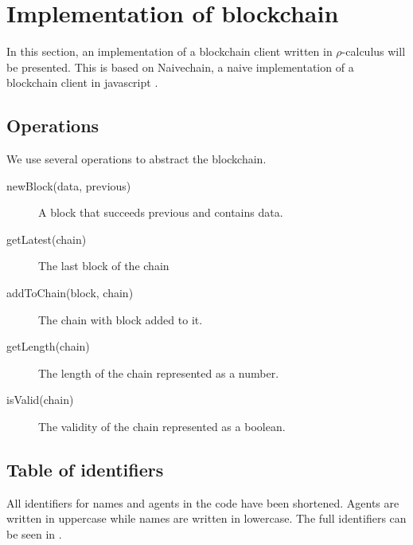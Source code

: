 \section{Implementation of blockchain}
In this section, an implementation of a blockchain client written in $\rho$-calculus will be presented.
This is based on Naivechain, a naive implementation of a blockchain client in javascript \cite{naivechain}.


\subsection{Operations}

We use several operations to abstract the blockchain.

\begin{description}
	\item[newBlock(data, previous)]
	A block that succeeds previous and contains data.
	\item[getLatest(chain)]
	The last block of the chain
	\item[addToChain(block, chain)]
	The chain with block added to it.
	\item[getLength(chain)]
	The length of the chain represented as a number.
	\item[isValid(chain)]
	The validity of the chain represented as a boolean.
\end{description}

\subsection{Table of identifiers}

All identifiers for names and agents in the code have been shortened. Agents are written in uppercase while names are written in lowercase. The full identifiers can be seen in .


